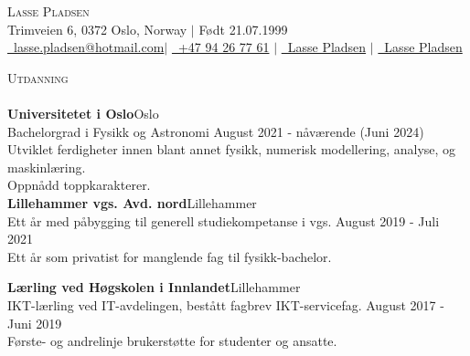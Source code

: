 \documentclass[a4paper]{article}
\newcommand{\lineunder} {
    \vspace*{-8pt} \\
    \hspace*{-18pt} \hrulefill \\
}
\newcommand{\header} [1] {
    {\hspace*{-18pt}\vspace*{6pt} \textsc{#1}}
    \vspace*{-6pt} \lineunder
}
\begin{document}
\vspace*{-40pt}

    

\vspace*{-10pt}
\begin{center}
	{\Huge \scshape {Lasse Pladsen}}\\
	Trimveien 6, 0372 Oslo, Norway $|$ Født 21.07.1999 \\ \href{mailto:lasse.pladsen@hotmail.com}{\raisebox{-0.05\height}\faEnvelope \ lasse.pladsen@hotmail.com}$|$ \href{tel:+4794267761}{\raisebox{-0.05\height}\faMobile \ +47 94 26 77 61} $|$ \href{https://www.linkedin.com/in/lasse-p-313b41126/}{\raisebox{-0.05\height}\faLinkedin\ Lasse Pladsen} $|$ \href{https://github.com/LassePladsen}{\raisebox{-0.05\height}\faGithub\ Lasse Pladsen} \\
\end{center}

\header{Utdanning}
\textbf{Universitetet i Oslo}\hfill Oslo\\
Bachelorgrad i Fysikk og Astronomi \hfill August 2021 - nåværende (Juni 2024)\\
Utviklet ferdigheter innen blant annet fysikk, numerisk modellering, analyse, og maskinlæring. \\
Oppnådd toppkarakterer.\\
\vspace{2mm}
\textbf{Lillehammer vgs. Avd. nord}\hfill Lillehammer\\ 
Ett år med påbygging til generell studiekompetanse i vgs. \hfill August 2019 - Juli 2021\\
Ett år som privatist for manglende fag til fysikk-bachelor.


\vspace{2mm}
\textbf{Lærling ved Høgskolen i Innlandet}\hfill Lillehammer\\
IKT-lærling ved IT-avdelingen, bestått fagbrev IKT-servicefag. \hfill August 2017 - Juni 2019\\
Første- og andrelinje brukerstøtte for studenter og ansatte.

\vspace{2mm}
\end{document}
